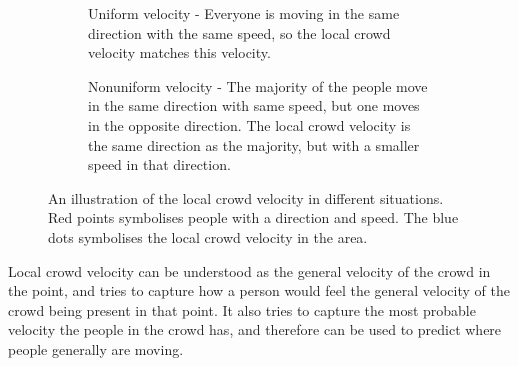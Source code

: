 \begin{figure}[htbp]
\centering
\begin{subfigure}[t]{0.48\linewidth}
\centering
{}
\caption{Uniform velocity - Everyone is moving in the same direction with the same speed, so the local crowd velocity matches this velocity.}
\end{subfigure}
\quad
\begin{subfigure}[t]{0.48\linewidth}
\centering
{}
\caption{Nonuniform velocity - The majority of the people move in the same direction with same speed, but one moves in the opposite direction. The local crowd velocity is the same direction as the majority, but with a smaller speed in that direction.}
\end{subfigure}
\caption[Local crowd velocity illustration]{An illustration of the local crowd velocity in different situations. Red points symbolises people with a direction and speed. The blue dots symbolises the local crowd velocity in the area.}
\label{fig:localCrowdVelocity}
\end{figure}

Local crowd velocity can be understood as the general velocity of the crowd in the point, and tries to capture how a person would feel the general velocity of the crowd being present in that point. It also tries to capture the most probable velocity the people in the crowd has, and therefore can be used to predict where people generally are moving.


